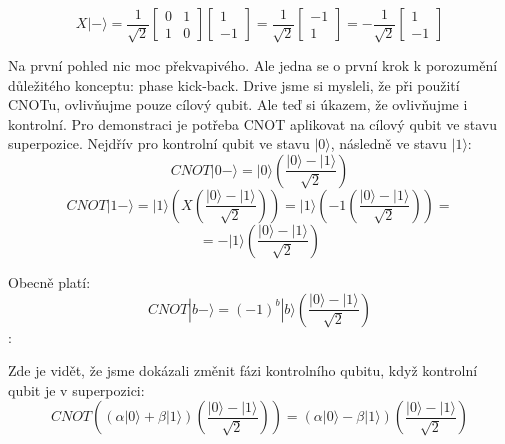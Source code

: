 \documentclass[11pt]{article}
\begin{document}
$$X|-\rangle = \frac{1}{\sqrt{2}}\begin{bmatrix}
        0 & 1 \\
        1 & 0
    \end{bmatrix} \begin{bmatrix}
        1 \\
        -1
    \end{bmatrix} = \frac{1}{\sqrt{2}} \begin{bmatrix}
        -1 \\
        1
    \end{bmatrix} = -\frac{1}{\sqrt{2}} \begin{bmatrix}
        1 \\
        -1
    \end{bmatrix} $$
\par Na první pohled nic moc překvapivého.
Ale jedna se o první krok k porozumění důležitého konceptu: phase kick-back.
Drive jsme si mysleli, že při použití CNOTu, ovlivňujme pouze cílový qubit.
Ale teď si úkazem, že ovlivňujme i kontrolní.
Pro demonstraci je potřeba CNOT aplikovat na cílový qubit ve stavu superpozice.
Nejdřív pro kontrolní qubit ve stavu $|0\rangle$, následně ve stavu $|1\rangle$:
$$CNOT |0-\rangle = |0\rangle \left(\frac{|0\rangle - |1\rangle}{\sqrt{2}}\right)$$
$$CNOT |1-\rangle = |1\rangle \left(X \left(\frac{|0\rangle - |1\rangle}{\sqrt{2}}\right)\right) = |1\rangle \left(-1\left(\frac{|0\rangle - |1\rangle}{\sqrt{2}}\right)\right) =$$
$$= -|1\rangle \left(\frac{|0\rangle - |1\rangle}{\sqrt{2}}\right)$$
\par Obecně platí:
$$CNOT |b-\rangle = (-1)^b|b\rangle\left(\frac{|0\rangle - |1\rangle}{\sqrt{2}}\right)$$:
\par Zde je vidět, že jsme dokázali změnit fázi kontrolního qubitu, když kontrolní qubit je v superpozici:
$$CNOT\left((\alpha|0\rangle + \beta|1\rangle)\left(\frac{|0\rangle - |1\rangle}{\sqrt{2}}\right)\right) = (\alpha|0\rangle - \beta|1\rangle)\left(\frac{|0\rangle - |1\rangle}{\sqrt{2}}\right)$$
\end{document}
